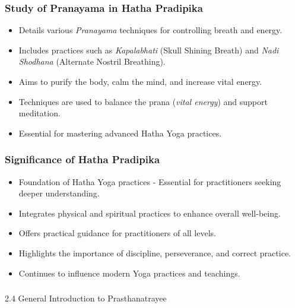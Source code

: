 \begin{frame}[fragile]\frametitle{Study of Pranayama in Hatha Pradipika}

      \begin{itemize}
		\item Details various \textit{Pranayama} techniques for controlling breath and energy.
		\item Includes practices such as \textit{Kapalabhati} (Skull Shining Breath) and \textit{Nadi Shodhana} (Alternate Nostril Breathing).
		\item Aims to purify the body, calm the mind, and increase vital energy.
		\item Techniques are used to balance the prana (\textit{vital energy}) and support meditation.
		\item Essential for mastering advanced Hatha Yoga practices.
	  \end{itemize}

\end{frame}

\begin{frame}[fragile]\frametitle{Significance of Hatha Pradipika}

      \begin{itemize}
		\item Foundation of Hatha Yoga practices - Essential for practitioners seeking deeper understanding.
		\item Integrates physical and spiritual practices to enhance overall well-being.
		\item Offers practical guidance for practitioners of all levels.
		\item Highlights the importance of discipline, perseverance, and correct practice.
		\item Continues to influence modern Yoga practices and teachings.
	  \end{itemize}

\end{frame}


\begin{frame}[fragile]\frametitle{}
\begin{center}
{\Large 2.4 General Introduction to Prasthanatrayee}
\end{center}
\end{frame}

